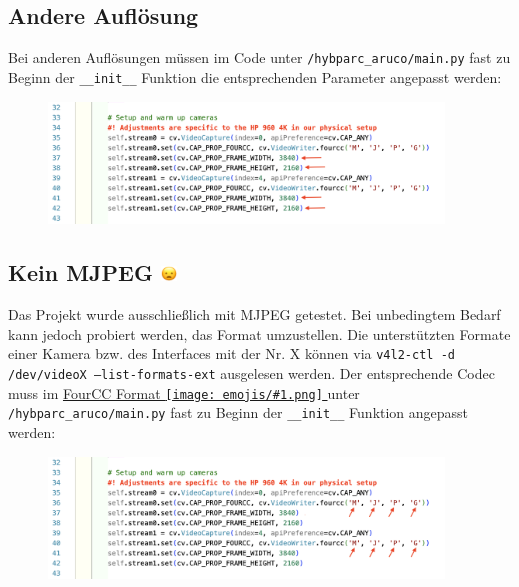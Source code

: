 \documentclass[a4paper, 10pt]{article}
\newcommand{\code}[1]{\texttt{#1}}
\newcommand{\emoji}[1]{
    \begingroup\normalfont
    \texttt{[image: emojis/\#1.png]}
    \endgroup
}
\begin{document}
\subsection{Andere Auflösung}
\label{ssec:custom-resolution}
Bei anderen Auflösungen müssen im Code unter \code{/hybparc\_aruco/main.py} fast zu Beginn der \code{\_\_init\_\_} Funktion die entsprechenden Parameter angepasst werden:
\begin{figure}[H]
    \centering
    \includegraphics[width=10.5cm]{resolution.png}
\end{figure}

\subsection{Kein MJPEG \includegraphics[height=0.75em]{emojis/open-mouth.png}}
\label{ssec:the-mjpeg-problem}
Das Projekt wurde ausschließlich mit MJPEG getestet. Bei unbedingtem Bedarf kann jedoch probiert werden, das Format umzustellen. Die unterstützten Formate einer Kamera bzw. des Interfaces mit der Nr. X können via \code{v4l2-ctl -d /dev/videoX --list-formats-ext} ausgelesen werden. Der entsprechende Codec muss im \href{https://fourcc.org/codecs.php}{FourCC Format\emoji{link}} unter \code{/hybparc\_aruco/main.py} fast zu Beginn der \code{\_\_init\_\_} Funktion angepasst werden:
\begin{figure}[H]
    \centering
    \includegraphics[width=10.5cm]{fourcc.png}
\end{figure}
\end{document}
